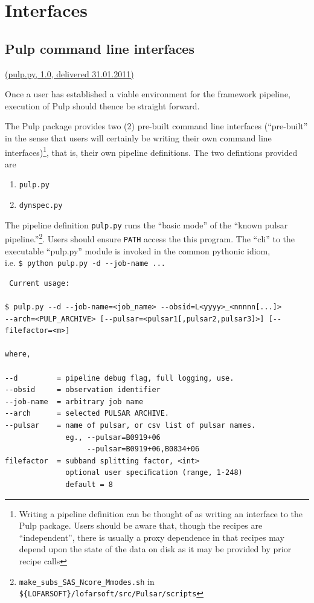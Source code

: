 \documentclass[a4paper,10pt,bibtotoc]{scrartcl}
\begin{document}

\section{Interfaces}
\label{sec:interfaces}
\subsection{Pulp command line interfaces}

\underline{(pulp.py, 1.0, delivered 31.01.2011)}

Once a user has established a viable environment for the framework pipeline, execution of Pulp should thence be straight forward.

The Pulp package provides two (2) pre-built command line interfaces
(``pre-built'' in the sense that users will certainly be writing their
own command line interfaces)\footnote{Writing a
pipeline definition can be thought of as writing an interface to the
Pulp package. Users should be aware that, though the recipes are
``independent'', there is usually a proxy dependence in that recipes
may depend upon the state of the data on disk as it may be provided by
prior recipe calls}, that is, their own pipeline definitions. The two
defintions provided are 
\begin{enumerate}
\item \verb|pulp.py|
\item \verb|dynspec.py|
\end{enumerate}

The pipeline definition \verb|pulp.py| runs the ``basic mode'' of the
``known pulsar pipeline.''\footnote{ \texttt{make\_subs\_SAS\_Ncore\_Mmodes.sh} in
\texttt{\$\{LOFARSOFT\}/lofarsoft/src/Pulsar/scripts}}. Users should
ensure \verb|PATH| access the this program. The ``cli'' to the
executable ``pulp.py'' module is invoked in the common pythonic idiom,\\

 i.e. \verb|$ python pulp.py -d --job-name ...|\\
\begin{verbatim}
 Current usage:

$ pulp.py --d --job-name=<job_name> --obsid=L<yyyy>_<nnnnn[...]>
--arch=<PULP_ARCHIVE> [--pulsar=<pulsar1[,pulsar2,pulsar3]>] [--filefactor=<m>]

where,

--d         = pipeline debug flag, full logging, use.
--obsid     = observation identifier          
--job-name  = arbitrary job name             
--arch      = selected PULSAR ARCHIVE.
--pulsar    = name of pulsar, or csv list of pulsar names.
              eg., --pulsar=B0919+06
                   --pulsar=B0919+06,B0834+06
filefactor  = subband splitting factor, <int>
              optional user speciﬁcation (range, 1-248)
              default = 8
\end{verbatim}
\end{document}
